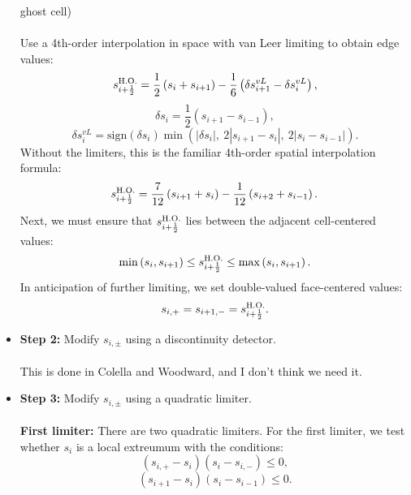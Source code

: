 \begin{itemize}
ghost cell)\\ \\
Use a 4th-order interpolation in space with van Leer limiting to obtain edge values:
\begin{equation}
s_{i+\frac{1}{2}}^{\text{H.O.}} = \frac{1}{2}\left(s_{i} + s_{i+1}\right) - \frac{1}{6}\left(\delta s_{i+1}^{vL} - \delta s_{i}^{vL}\right),
\end{equation}
\begin{equation}
\delta s_i = \frac{1}{2}\left(s_{i+1}-s_{i-1}\right),
\end{equation}
\begin{equation}
\delta s_i^{vL} = \text{sign}(\delta s_i)\min\left(|\delta s_i|, ~ 2|s_{i+1}-s_{i}|, ~ 2|s_i-s_{i-1}|\right).
\end{equation}
Without the limiters, this is the familiar 4th-order spatial interpolation formula:
\begin{equation}
s_{i+\frac{1}{2}}^{\text{H.O.}} = \frac{7}{12}\left(s_{i+1}+s_i\right) - \frac{1}{12}\left(s_{i+2}+s_{i-1}\right).
\end{equation}
Next, we must ensure that $s_{i+\frac{1}{2}}^{\text{H.O.}}$ lies between the adjacent 
cell-centered values:
\begin{equation}
\min\left(s_{i},s_{i+1}\right) \le s_{i+\frac{1}{2}}^{\text{H.O.}} \le \max\left(s_{i},s_{i+1}\right).
\end{equation}
In anticipation of further limiting, we set double-valued face-centered values:
\begin{equation}
s_{i,+} = s_{i+1,-} = s_{i+\frac{1}{2}}^{\text{H.O.}}.
\end{equation}
\item {\bf Step 2:} Modify $s_{i,\pm}$ using a discontinuity detector.\\ \\
This is done in Colella and Woodward, and I don't think we need it.
\item {\bf Step 3:} Modify $s_{i,\pm}$ using a quadratic limiter.\\ \\
{\bf First limiter:} There are two quadratic limiters.  
For the first limiter, we test whether 
$s_i$ is a local extreumum with the conditions:
\begin{equation}
\left(s_{i,+}-s_i\right)\left(s_i-s_{i,-}\right) \le 0,
\end{equation}
\begin{equation}
\left(s_{i+1}-s_{i}\right)\left(s_{i}-s_{i-1}\right) \le 0.
\end{equation}

\end{itemize}
